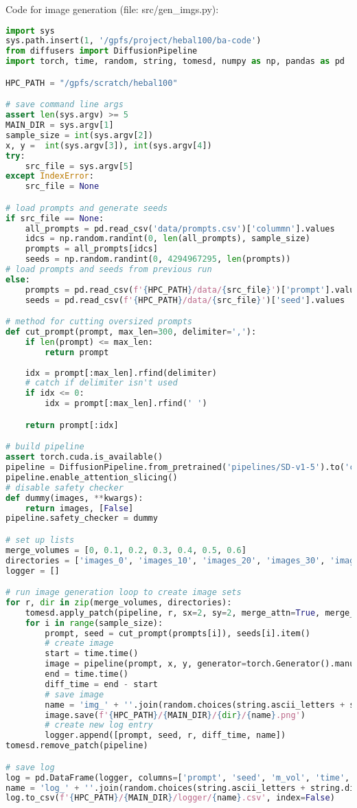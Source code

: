 Code for image generation (file: src/gen\_imgs.py):
\begin{lstlisting}[language=Python]
import sys       
sys.path.insert(1, '/gpfs/project/hebal100/ba-code')
from diffusers import DiffusionPipeline
import torch, time, random, string, tomesd, numpy as np, pandas as pd

HPC_PATH = "/gpfs/scratch/hebal100"

# save command line args
assert len(sys.argv) >= 5
MAIN_DIR = sys.argv[1]                      
sample_size = int(sys.argv[2])            
x, y =  int(sys.argv[3]), int(sys.argv[4]) 
try:
    src_file = sys.argv[5]                
except IndexError:
    src_file = None          

# load prompts and generate seeds
if src_file == None:
    all_prompts = pd.read_csv('data/prompts.csv')['colummn'].values
    idcs = np.random.randint(0, len(all_prompts), sample_size)
    prompts = all_prompts[idcs]
    seeds = np.random.randint(0, 4294967295, len(prompts))
# load prompts and seeds from previous run
else:
    prompts = pd.read_csv(f'{HPC_PATH}/data/{src_file}')['prompt'].values
    seeds = pd.read_csv(f'{HPC_PATH}/data/{src_file}')['seed'].values

# method for cutting oversized prompts
def cut_prompt(prompt, max_len=300, delimiter=','):
    if len(prompt) <= max_len:
        return prompt
    
    idx = prompt[:max_len].rfind(delimiter)
    # catch if delimiter isn't used
    if idx <= 0:
        idx = prompt[:max_len].rfind(' ')

    return prompt[:idx]

# build pipeline
assert torch.cuda.is_available()
pipeline = DiffusionPipeline.from_pretrained('pipelines/SD-v1-5').to('cuda')
pipeline.enable_attention_slicing()
# disable safety checker
def dummy(images, **kwargs):
    return images, [False]
pipeline.safety_checker = dummy

# set up lists
merge_volumes = [0, 0.1, 0.2, 0.3, 0.4, 0.5, 0.6]
directories = ['images_0', 'images_10', 'images_20', 'images_30', 'images_40', 'images_50', 'images_60']
logger = []

# run image generation loop to create image sets
for r, dir in zip(merge_volumes, directories):
    tomesd.apply_patch(pipeline, r, sx=2, sy=2, merge_attn=True, merge_crossattn=False, merge_mlp=False)
    for i in range(sample_size):
        prompt, seed = cut_prompt(prompts[i]), seeds[i].item()
        # create image
        start = time.time()
        image = pipeline(prompt, x, y, generator=torch.Generator().manual_seed(seed), ).images[0]
        end = time.time()
        diff_time = end - start
        # save image
        name = 'img_' + ''.join(random.choices(string.ascii_letters + string.digits, k=10))
        image.save(f'{HPC_PATH}/{MAIN_DIR}/{dir}/{name}.png')
        # create new log entry
        logger.append([prompt, seed, r, diff_time, name])       
tomesd.remove_patch(pipeline)

# save log
log = pd.DataFrame(logger, columns=['prompt', 'seed', 'm_vol', 'time', 'name'])
name = 'log_' + ''.join(random.choices(string.ascii_letters + string.digits, k=5))
log.to_csv(f'{HPC_PATH}/{MAIN_DIR}/logger/{name}.csv', index=False)
\end{lstlisting}
